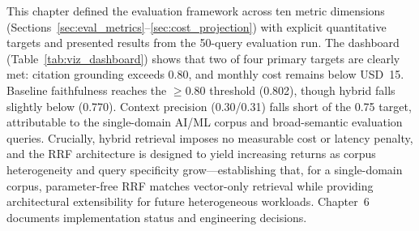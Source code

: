 \medskip
\noindent This chapter defined the evaluation framework across ten metric dimensions (Sections~\ref{sec:eval_metrics}--\ref{sec:cost_projection}) with explicit quantitative targets and presented results from the 50-query evaluation run. The dashboard (Table~\ref{tab:viz_dashboard}) shows that two of four primary targets are clearly met: citation grounding exceeds 0.80, and monthly cost remains below USD~15. Baseline faithfulness reaches the $\geq 0.80$ threshold (0.802), though hybrid falls slightly below (0.770). Context precision (0.30/0.31) falls short of the 0.75 target, attributable to the single-domain AI/ML corpus and broad-semantic evaluation queries. Crucially, hybrid retrieval imposes no measurable cost or latency penalty, and the RRF architecture is designed to yield increasing returns as corpus heterogeneity and query specificity grow---establishing that, for a single-domain corpus, parameter-free RRF matches vector-only retrieval while providing architectural extensibility for future heterogeneous workloads. Chapter~6 documents implementation status and engineering decisions.
